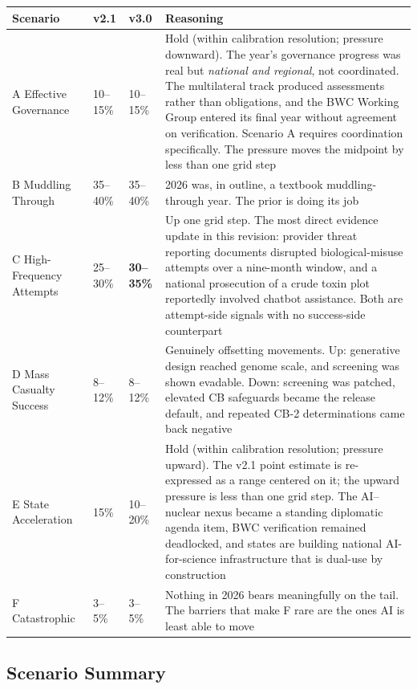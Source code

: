 \documentclass[11pt,letterpaper]{article}
\begin{document}
\begin{center}
\small
\begin{tabular}{L{2.6cm}L{1.5cm}L{1.5cm}L{9.2cm}}
\toprule
\textbf{Scenario} & \textbf{v2.1} & \textbf{v3.0} & \textbf{Reasoning} \\
\midrule
A Effective Governance & 10--15\% & 10--15\% & Hold (within calibration resolution; pressure downward). The year's governance progress was real but \textit{national and regional}, not coordinated. The multilateral track produced assessments rather than obligations, and the BWC Working Group entered its final year without agreement on verification. Scenario A requires coordination specifically. The pressure moves the midpoint by less than one grid step \\
B Muddling Through & 35--40\% & 35--40\% & 2026 was, in outline, a textbook muddling-through year. The prior is doing its job \\
C High-Frequency Attempts & 25--30\% & \textbf{30--35\%} & Up one grid step. The most direct evidence update in this revision: provider threat reporting documents disrupted biological-misuse attempts over a nine-month window, and a national prosecution of a crude toxin plot reportedly involved chatbot assistance. Both are attempt-side signals with no success-side counterpart \\
D Mass Casualty Success & 8--12\% & 8--12\% & Genuinely offsetting movements. Up: generative design reached genome scale, and screening was shown evadable. Down: screening was patched, elevated CB safeguards became the release default, and repeated CB-2 determinations came back negative \\
E State Acceleration & 15\% & 10--20\% & Hold (within calibration resolution; pressure upward). The v2.1 point estimate is re-expressed as a range centered on it; the upward pressure is less than one grid step. The AI--nuclear nexus became a standing diplomatic agenda item, BWC verification remained deadlocked, and states are building national AI-for-science infrastructure that is dual-use by construction \\
F Catastrophic & 3--5\% & 3--5\% & Nothing in 2026 bears meaningfully on the tail. The barriers that make F rare are the ones AI is least able to move \\
\bottomrule
\end{tabular}
\end{center}

\subsection{Scenario Summary}
\end{document}
